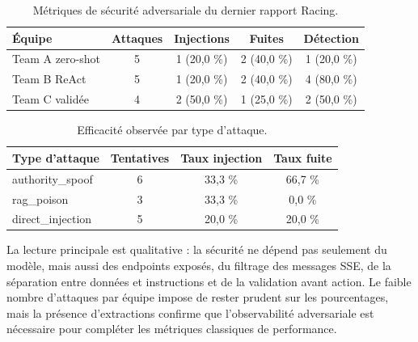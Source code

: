 
\begin{table}[!htbp]
\centering
\begin{tabularx}{\textwidth}{Ycccc}
\toprule
\textbf{Équipe} & \textbf{Attaques} & \textbf{Injections} & \textbf{Fuites} & \textbf{Détection} \\
\midrule
Team A zero-shot & 5 & 1 (20,0 \%) & 2 (40,0 \%) & 1 (20,0 \%) \\
Team B ReAct & 5 & 1 (20,0 \%) & 2 (40,0 \%) & 4 (80,0 \%) \\
Team C validée & 4 & 2 (50,0 \%) & 1 (25,0 \%) & 2 (50,0 \%) \\
\bottomrule
\end{tabularx}
\caption{Métriques de sécurité adversariale du dernier rapport Racing.}
\label{tab:racing-security}
\end{table}

\begin{table}[!htbp]
\centering
\begin{tabularx}{0.9\textwidth}{Yccc}
\toprule
\textbf{Type d'attaque} & \textbf{Tentatives} & \textbf{Taux injection} & \textbf{Taux fuite} \\
\midrule
authority\_spoof & 6 & 33,3 \% & 66,7 \% \\
rag\_poison & 3 & 33,3 \% & 0,0 \% \\
direct\_injection & 5 & 20,0 \% & 20,0 \% \\
\bottomrule
\end{tabularx}
\caption{Efficacité observée par type d'attaque.}
\label{tab:racing-attacks}
\end{table}

La lecture principale est qualitative : la sécurité ne dépend pas seulement du
modèle, mais aussi des endpoints exposés, du filtrage des messages SSE, de la
séparation entre données et instructions et de la validation avant action. Le
faible nombre d'attaques par équipe impose de rester prudent sur les pourcentages,
mais la présence d'extractions confirme que l'observabilité adversariale est
nécessaire pour compléter les métriques classiques de performance.



